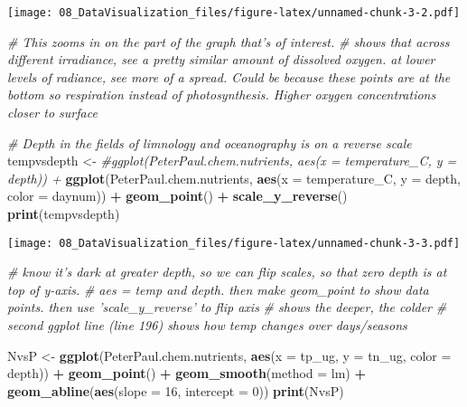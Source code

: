\documentclass[]{article}
\newenvironment{Shaded}{\begin{snugshade}}{\end{snugshade}}
\newcommand{\KeywordTok}[1]{\textcolor[rgb]{0.13,0.29,0.53}{\textbf{#1}}}
\newcommand{\DataTypeTok}[1]{\textcolor[rgb]{0.13,0.29,0.53}{#1}}
\newcommand{\DecValTok}[1]{\textcolor[rgb]{0.00,0.00,0.81}{#1}}
\newcommand{\StringTok}[1]{\textcolor[rgb]{0.31,0.60,0.02}{#1}}
\newcommand{\CommentTok}[1]{\textcolor[rgb]{0.56,0.35,0.01}{\textit{#1}}}
\newcommand{\OperatorTok}[1]{\textcolor[rgb]{0.81,0.36,0.00}{\textbf{#1}}}
\newcommand{\NormalTok}[1]{#1}
\begin{document}
\texttt{[image: 08\_DataVisualization\_files/figure-latex/unnamed-chunk-3-2.pdf]}

\begin{Shaded}
\begin{Highlighting}[]
\CommentTok{# This zooms in on the part of the graph that's of interest. }
\CommentTok{# shows that across different irradiance, see a pretty similar amount of dissolved oxygen. at lower levels of radiance, see more of a spread. Could be because these points are at the bottom so respiration instead of photosynthesis. Higher oxygen concentrations closer to surface}

\CommentTok{# Depth in the fields of limnology and oceanography is on a reverse scale}
\NormalTok{tempvsdepth <-}\StringTok{ }
\StringTok{  }\CommentTok{#ggplot(PeterPaul.chem.nutrients, aes(x = temperature_C, y = depth)) +}
\StringTok{  }\KeywordTok{ggplot}\NormalTok{(PeterPaul.chem.nutrients, }\KeywordTok{aes}\NormalTok{(}\DataTypeTok{x =}\NormalTok{ temperature_C, }\DataTypeTok{y =}\NormalTok{ depth, }\DataTypeTok{color =}\NormalTok{ daynum)) }\OperatorTok{+}
\StringTok{  }\KeywordTok{geom_point}\NormalTok{() }\OperatorTok{+}
\StringTok{  }\KeywordTok{scale_y_reverse}\NormalTok{()}
\KeywordTok{print}\NormalTok{(tempvsdepth)}
\end{Highlighting}
\end{Shaded}

\texttt{[image: 08\_DataVisualization\_files/figure-latex/unnamed-chunk-3-3.pdf]}

\begin{Shaded}
\begin{Highlighting}[]
\CommentTok{# know it's dark at greater depth, so we can flip scales, so that zero depth is at top of y-axis.}
\CommentTok{# aes = temp and depth. then make geom_point to show data points. then use 'scale_y_reverse' to flip axis}
\CommentTok{# shows the deeper, the colder}
\CommentTok{# second ggplot line (line 196) shows how temp changes over days/seasons}

\NormalTok{NvsP <-}
\StringTok{  }\KeywordTok{ggplot}\NormalTok{(PeterPaul.chem.nutrients, }\KeywordTok{aes}\NormalTok{(}\DataTypeTok{x =}\NormalTok{ tp_ug, }\DataTypeTok{y =}\NormalTok{ tn_ug, }\DataTypeTok{color =}\NormalTok{ depth)) }\OperatorTok{+}
\StringTok{  }\KeywordTok{geom_point}\NormalTok{() }\OperatorTok{+}
\StringTok{  }\KeywordTok{geom_smooth}\NormalTok{(}\DataTypeTok{method =}\NormalTok{ lm) }\OperatorTok{+}
\StringTok{  }\KeywordTok{geom_abline}\NormalTok{(}\KeywordTok{aes}\NormalTok{(}\DataTypeTok{slope =} \DecValTok{16}\NormalTok{, }\DataTypeTok{intercept =} \DecValTok{0}\NormalTok{))}
\KeywordTok{print}\NormalTok{(NvsP)}
\end{Highlighting}
\end{Shaded}
\end{document}
